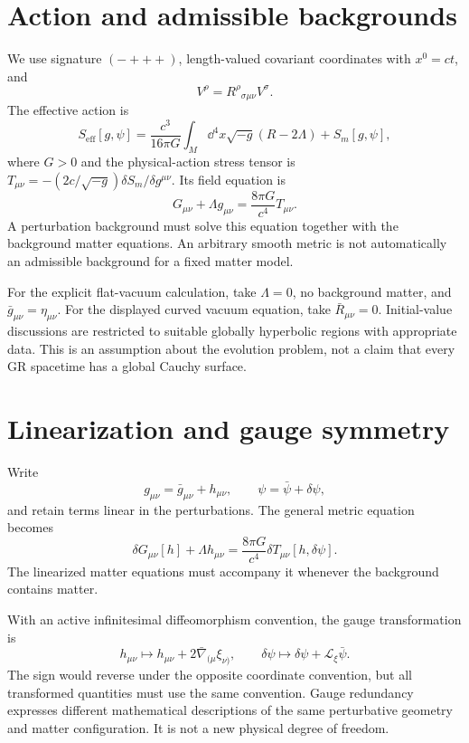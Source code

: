 \documentclass[11pt]{article}
\begin{document}
\section{Action and admissible backgrounds}
We use signature $(-+++)$, length-valued covariant coordinates with $x^0=ct$, and
\begin{equation}
[\nabla_\mu,\nabla_\nu]V^\rho=R^\rho{}_{\sigma\mu\nu}V^\sigma.
\end{equation}
The effective action is
\begin{equation}
S_{\mathrm{eff}}[g,\psi]=\frac{c^3}{16\pi G}
\int_M\dd^4x\sqrt{-g}(R-2\Lambda)+S_m[g,\psi],
\label{eq:SA}
\end{equation}
where $G>0$ and the physical-action stress tensor is
$T_{\mu\nu}=-(2c/\sqrt{-g})\delta S_m/\delta g^{\mu\nu}$. Its field equation is
\begin{equation}
G_{\mu\nu}+\Lambda g_{\mu\nu}=\frac{8\pi G}{c^4}T_{\mu\nu}.
\label{eq:einstein}
\end{equation}
A perturbation background must solve this equation together with the background matter equations. An arbitrary smooth metric is not automatically an admissible background for a fixed matter model.

For the explicit flat-vacuum calculation, take $\Lambda=0$, no background matter, and $\bar g_{\mu\nu}=\eta_{\mu\nu}$. For the displayed curved vacuum equation, take $\bar R_{\mu\nu}=0$. Initial-value discussions are restricted to suitable globally hyperbolic regions with appropriate data. This is an assumption about the evolution problem, not a claim that every GR spacetime has a global Cauchy surface.

\section{Linearization and gauge symmetry}
Write
\begin{equation}
g_{\mu\nu}=\bar g_{\mu\nu}+h_{\mu\nu},\qquad
\psi=\bar\psi+\delta\psi,
\label{eq:split}
\end{equation}
and retain terms linear in the perturbations. The general metric equation becomes
\begin{equation}
\delta G_{\mu\nu}[h]+\Lambda h_{\mu\nu}
=\frac{8\pi G}{c^4}\delta T_{\mu\nu}[h,\delta\psi].
\label{eq:linearizedeinstein}
\end{equation}
The linearized matter equations must accompany it whenever the background contains matter.

With an active infinitesimal diffeomorphism convention, the gauge transformation is
\begin{equation}
h_{\mu\nu}\longmapsto h_{\mu\nu}+2\bar\nabla_{(\mu}\xi_{\nu)},
\qquad \delta\psi\longmapsto\delta\psi+\mathcal L_\xi\bar\psi.
\label{eq:gaugetransform}
\end{equation}
The sign would reverse under the opposite coordinate convention, but all transformed quantities must use the same convention. Gauge redundancy expresses different mathematical descriptions of the same perturbative geometry and matter configuration. It is not a new physical degree of freedom.
\end{document}
